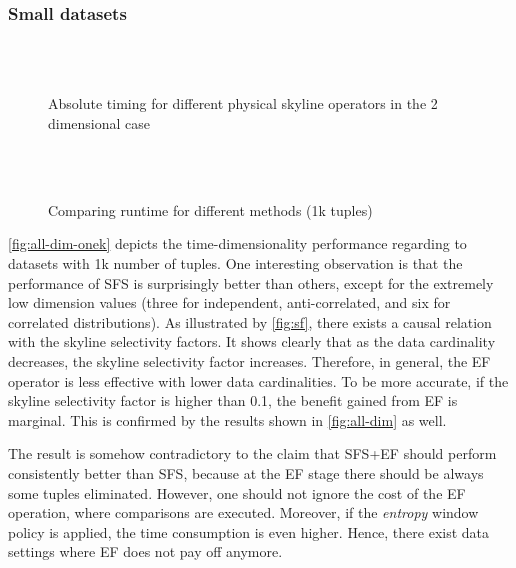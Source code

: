\subsubsection{Small datasets}
\label{sec:small-datasets}

\begin{figure}[htbp]
\centering%
\begin{minipage}{\onecolumnwidth}%
\\
\\
%
\caption{Absolute timing for different physical skyline operators 
in the 2 dimensional case}%
\end{minipage}%
\hspace{\columnsep}%
\begin{minipage}{\onecolumnwidth}%
\\
\\
%
\caption{Comparing runtime for different methods (1k tuples)}
\label{fig:all-dim-onek}
\end{minipage}%
\end{figure}

\autoref{fig:all-dim-onek} depicts the time-dimensionality
performance regarding to datasets with 1k number of tuples.  One
interesting observation is that the performance of SFS is surprisingly
better than others, except for the extremely low dimension values
(three for independent, anti-correlated, and six for correlated
distributions).  As illustrated by \autoref{fig:sf}, there exists a
causal relation with the skyline selectivity factors.  It shows
clearly that as the data cardinality decreases, the skyline
selectivity factor increases. Therefore, in general, the EF operator
is less effective with lower data cardinalities. To be more accurate,
if the skyline selectivity factor is higher than 0.1, the benefit
gained from EF is marginal.  This is confirmed by the results shown in
\autoref{fig:all-dim} as well.

The result is somehow contradictory to the claim that SFS+EF should
perform consistently better than SFS, because at the EF stage there
should be always some tuples eliminated. However, one should not
ignore the cost of the EF operation, where comparisons are
executed. Moreover, if the \emph{entropy} window policy is applied,
the time consumption is even higher. Hence, there exist data settings
where EF does not pay off anymore.

